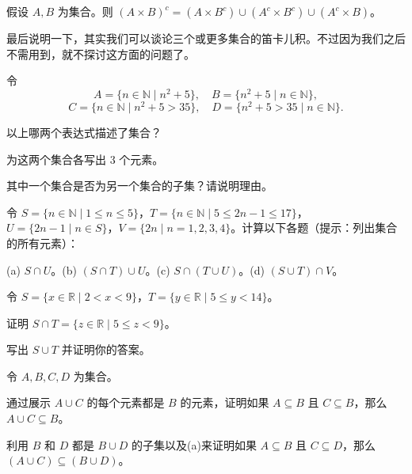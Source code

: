 \begin{proposition}
假设 $A, B$ 为集合。则 $(A \times B)^c = (A \times B^c) \cup (A^c \times B^c) \cup (A^c \times B)$。
\end{proposition}

最后说明一下，其实我们可以谈论三个或更多集合的笛卡儿积。不过因为我们之后不需用到，就不探讨这方面的问题了。

\begin{problemset}
  \item 令
    $$ A = \{n \in \mathbb{N} \mid n^2 + 5\}, \quad B = \{n^2 + 5 \mid n \in \mathbb{N}\}, $$
    $$ C = \{n \in \mathbb{N} \mid n^2 + 5 > 35\}, \quad D = \{n^2 + 5 > 35 \mid n \in \mathbb{N}\}. $$
    \begin{probenumerate}
        \item 以上哪两个表达式描述了集合？
        \item 为这两个集合各写出 3 个元素。
        \item 其中一个集合是否为另一个集合的子集？请说明理由。
    \end{probenumerate}

    \item 令 $S = \{n \in \mathbb{N} \mid 1 \leq n \leq 5\}$，$T = \{n \in \mathbb{N} \mid 5 \leq 2n - 1 \leq 17\}$，$U = \{2n - 1 \mid n \in S\}$，$V = \{2n \mid n = 1, 2, 3, 4\}$。计算以下各题（提示：列出集合的所有元素）：

    \noindent (a) $S \cap U$。(b) $(S \cap T) \cup U$。(c) $S \cap (T \cup U)$。(d) $(S \cup T) \cap V$。

    \item 令 $S = \{x \in \mathbb{R} \mid 2 < x < 9\}$，$T = \{y \in \mathbb{R} \mid 5 \leq y < 14\}$。
    \begin{probenumerate}
        \item 证明 $S \cap T = \{z \in \mathbb{R} \mid 5 \leq z < 9\}$。
        \item 写出 $S \cup T$ 并证明你的答案。
    \end{probenumerate}

    \item 令 $A, B, C, D$ 为集合。
    \begin{probenumerate}
        \item 通过展示 $A \cup C$ 的每个元素都是 $B$ 的元素，证明如果 $A \subseteq B$ 且 $C \subseteq B$，那么 $A \cup C \subseteq B$。
        \item 利用 $B$ 和 $D$ 都是 $B \cup D$ 的子集以及(a)来证明如果 $A \subseteq B$ 且 $C \subseteq D$，那么 $(A \cup C) \subseteq (B \cup D)$。
    \end{probenumerate}


\end{problemset}
